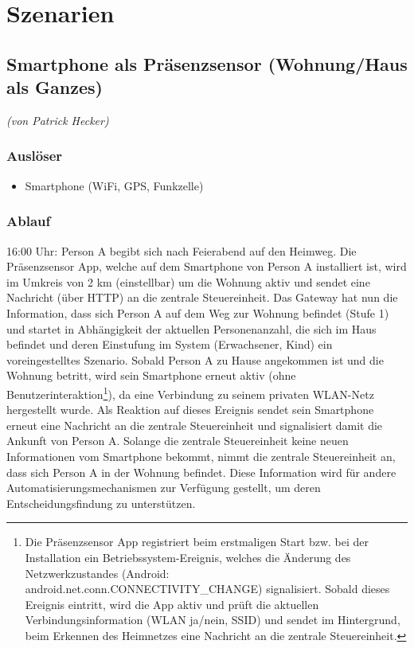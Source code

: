 
\chapter{Szenarien}
\label{[chap:szenarien]}

\section{Smartphone als Präsenzsensor (Wohnung/Haus als Ganzes)}
\emph{(von Patrick Hecker)}

\subsection{Auslöser}
\begin{itemize}
	\item Smartphone (WiFi, GPS, Funkzelle)
\end{itemize}

\subsection{Ablauf}
16:00 Uhr: Person A begibt sich nach Feierabend auf den Heimweg. Die Präsenzsensor App, welche auf dem Smartphone von Person A installiert ist, wird im Umkreis von 2 km (einstellbar) um die Wohnung aktiv und sendet eine Nachricht (über HTTP) an die zentrale Steuereinheit. Das Gateway hat nun die Information, dass sich Person A auf dem Weg zur Wohnung befindet (Stufe 1) und startet in Abhängigkeit der aktuellen Personenanzahl, die sich im Haus befindet und deren Einstufung im System (Erwachsener, Kind) ein voreingestelltes Szenario. Sobald Person A zu Hause angekommen ist und die Wohnung betritt, wird sein Smartphone erneut aktiv (ohne Benutzerinteraktion\footnote{Die Präsenzsensor App registriert beim erstmaligen Start bzw. bei der Installation ein Betriebssystem-Ereignis, welches die Änderung des Netzwerkzustandes (Android: android.net.conn.CONNECTIVITY\_CHANGE) signalisiert. Sobald dieses Ereignis eintritt, wird die App aktiv und prüft die aktuellen Verbindungsinformation (WLAN ja/nein, SSID) und sendet im Hintergrund, beim Erkennen des Heimnetzes eine Nachricht an die zentrale Steuereinheit.}), da eine Verbindung zu seinem privaten WLAN-Netz hergestellt wurde. Als Reaktion auf dieses Ereignis sendet sein Smartphone erneut eine Nachricht an die zentrale Steuereinheit und signalisiert damit die Ankunft von Person A. Solange die zentrale Steuereinheit keine neuen Informationen vom Smartphone bekommt, nimmt die zentrale Steuereinheit an, dass sich Person A in der Wohnung befindet. Diese Information wird für andere Automatisierungsmechanismen zur Verfügung gestellt, um deren Entscheidungsfindung zu unterstützen.

